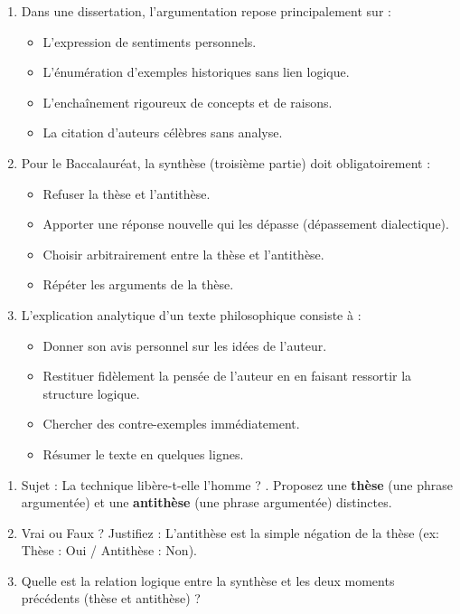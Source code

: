 \documentclass[11pt]{article}
\begin{document}
\begin{exercice}
\begin{enumerate}
    \item Dans une dissertation, l'argumentation repose principalement sur :
    \begin{itemize}
        \item[A.] L'expression de sentiments personnels.
        \item[B.] L'énumération d'exemples historiques sans lien logique.
        \item[C.] L'enchaînement rigoureux de concepts et de raisons.
        \item[D.] La citation d'auteurs célèbres sans analyse.
    \end{itemize}
    \item Pour le Baccalauréat, la \og synthèse \fg{} (troisième partie) doit obligatoirement :
    \begin{itemize}
        \item[A.] Refuser la thèse et l'antithèse.
        \item[B.] Apporter une réponse nouvelle qui les dépasse (dépassement dialectique).
        \item[C.] Choisir arbitrairement entre la thèse et l'antithèse.
        \item[D.] Répéter les arguments de la thèse.
    \end{itemize}
    \item L'explication analytique d'un texte philosophique consiste à :
    \begin{itemize}
        \item[A.] Donner son avis personnel sur les idées de l'auteur.
        \item[B.] Restituer fidèlement la pensée de l'auteur en en faisant ressortir la structure logique.
        \item[C.] Chercher des contre-exemples immédiatement.
        \item[D.] Résumer le texte en quelques lignes.
    \end{itemize}
\end{enumerate}
\end{exercice}

\begin{exercice}
\begin{enumerate}
    \item Sujet : \og La technique libère-t-elle l'homme ? \fg. Proposez une \textbf{thèse} (une phrase argumentée) et une \textbf{antithèse} (une phrase argumentée) distinctes.
    \item Vrai ou Faux ? Justifiez : \og L'antithèse est la simple négation de la thèse (ex: Thèse : Oui / Antithèse : Non). \fg
    \item Quelle est la relation logique entre la synthèse et les deux moments précédents (thèse et antithèse) ?
\end{enumerate}
\end{exercice}
\end{document}

